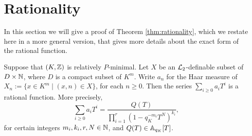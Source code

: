 \section{Rationality}\label{sec:rationality}
In this section we will give a proof of Theorem \ref{thm:rationality}, which we restate here in a more general version, that gives more details about the exact form of the rational function. 
\begin{thm}\label{thm:rationalitygeneral}
Suppose that $(K,\Z)$ is relatively $P$-minimal. Let $X$ be an $\cL_2$-definable subset of $D\times \NN$, where $D$ is a compact subset of $K^m$.  Write $a_n$ for the Haar measure of $X_n:=\{x\in K^m\mid (x,n)\in X\}$, for each $n\geq 0$. Then the series $\sum_{i\geq 0} a_i T^i$ is a rational function. More precisely, 
\[\sum_{i\geq 0} a_i T^i = \frac{Q(T) }{\prod_{i=1}^r(1-q_K^{-m_i}T^N)^{k_i}},\]
for certain integers $m_i, k_i,r, N \in \NN$, and $Q(T) \in \AA_{q_K}[T]$. 
\end{thm}
